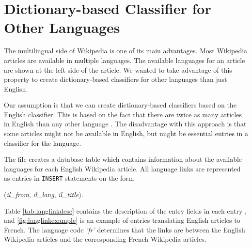 \section{Dictionary-based Classifier for Other Languages}
\label{sec:dictionary_based_classifier_for_other_languages}
The multilingual side of Wikipedia is one of its main advantages.
Most Wikipedia articles are available in multiple languages. The available languages for an article are shown at the left side of the article. We wanted to take advantage of this property to create dictionary-based classifiers for other languages than just English. 

Our assumption is that we can create dictionary-based classifiers based on the English classifier. This is based on the fact that there are twice as many articles in English than any other language \cite{wiki:wikipedia}. The disadvantage with this approach is that some articles might not be available in English, but might be essential entries in a classifier for the language. 



The file \enwikilanglinks creates a database table which contains information about the available languages for each English Wikipedia article.
All language links are represented as entries in \texttt{INSERT} statements on the form
\begin{center}
(\emph{il\_from}, \emph{il\_lang}, \emph{il\_title}).
\end{center}

Table \ref{tab:langlinkdesc} contains the description of the entry fields in each entry 
\cite{wiki:langlinks}, and \ref{fig:langlinkexample} is an example of entries translating English articles to French. The language code \emph{'fr'} determines that the links are between the English Wikipedia articles and the corresponding French Wikipedia articles. 


